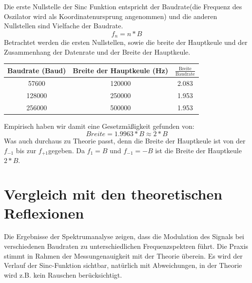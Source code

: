 Die erste Nullstelle der Sinc Funktion entspricht der Baudrate(die Frequenz des Oszilator wird als Koordinatenursprung angenommen)
und die anderen Nullstellen sind Vielfache der Baudrate.
\begin{equation}
    f_n = n * B
\end{equation}
Betrachtet werden die ersten Nullstellen, sowie die breite der Hauptkeule und der Zusammenhang der Datenrate und der Breite der Hauptkeule.

\begin{center}
\begin{tabular}{|c|c|c|}
    \hline
    Baudrate (Baud) & Breite der Hauptkeule (Hz)& $\frac{\text{Breite}}{\text{Baudrate}}$  \\
    \hline
    57600 & 120000 & 2.083 \\
    128000 & 250000 & 1.953 \\
    256000 & 500000 & 1.953 \\
    \hline
\end{tabular}
\end{center}

Empirisch haben wir damit eine Gesetzmäßigkeit gefunden von:
\begin{equation}
    Breite = 1.9963 * B \approx 2 * B
\end{equation}
Was auch durchaus zu Theorie passt, denn die Breite der Hauptkeule ist von der $f_{-1}$ bis zur $f_{+1}$gegeben.
Da $f_{1} = B$ und $f_{-1} = -B$ ist die Breite der Hauptkeule $2 * B$.

\section{Vergleich mit den theoretischen Reflexionen}
Die Ergebnisse der Spektrumanalyse zeigen, dass die Modulation des Signals bei verschiedenen Baudraten zu unterschiedlichen Frequenzspektren führt. Die Praxis stimmt in Rahmen der Messungenauigkeit mit der Theorie überein.
Es wird der Verlauf der Sinc-Funktion sichtbar, natürlich mit Abweichungen, in der Theorie wird z.B. kein Rauschen berücksichtigt.
\clearpage
